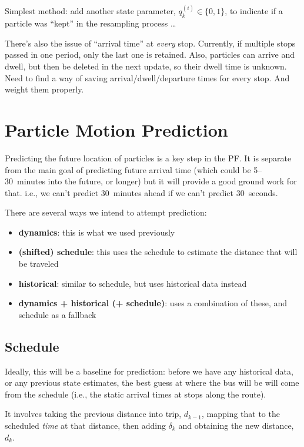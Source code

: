 \documentclass[10pt,a4paper]{article}
\begin{document}
Simplest method: add another state parameter, $q_k^{(i)} \in \{0,1\}$,
to indicate if a particle was ``kept'' in the resampling process \ldots


There's also the issue of ``arrival time'' at \emph{every} stop.
Currently, if multiple stops passed in one period,
only the last one is retained.
Also, particles can arrive and dwell, but then be deleted in the next
update, so their dwell time is unknown.
Need to find a way of saving arrival/dwell/departure times for every stop.
And weight them properly.



\section{Particle Motion Prediction}
\label{sec:particle-prediction}

Predicting the future location of particles is a key step in the PF. 
It is separate from the main goal of predicting future arrival time 
(which could be 5--30~minutes into the future, or longer)
but it will provide a good ground work for that.
i.e., we can't predict 30~minutes ahead if we can't predict 30~seconds.

There are several ways we intend to attempt prediction:
\begin{itemize}
\item \textbf{dynamics}: this is what we used previously
\item \textbf{(shifted) schedule}: this uses the schedule to estimate the distance that will be traveled
\item \textbf{historical}: similar to schedule, but uses historical data instead
\item \textbf{dynamics + historical (+ schedule)}: uses a combination of these, and schedule as a fallback
\end{itemize}


\subsection{Schedule}

Ideally, this will be a baseline for prediction: before we have any historical data,
or any previous state estimates, the best guess at where the bus will be will come from
the schedule (i.e., the static arrival times at stops along the route).

It involves taking the previous distance into trip, $d_{k-1}$, 
mapping that to the scheduled \emph{time} at that distance,
then adding $\delta_k$ and obtaining the new distance, $d_k$.
\end{document}
